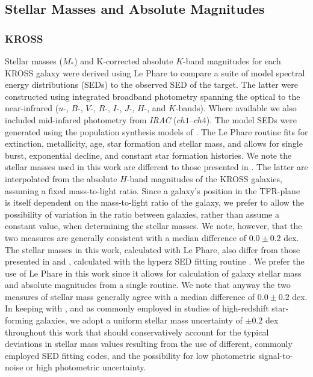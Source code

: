 \documentclass[a4paper,fleqn,usenatbib]{mnras}
\begin{document}
\subsection{Stellar Masses and Absolute Magnitudes}

\subsubsection{KROSS}
\label{subsubsec:KROSSSED}

Stellar masses ($M_{*}$) and K-corrected absolute $K$-band magnitudes for each KROSS galaxy were derived using {\sc Le Phare} \citep{Arnouts:1999,Ilbert:2006} to compare a suite of model spectral energy distributions (SEDs) to the observed SED of the target. The latter were constructed using integrated broadband photometry spanning the optical to the near-infrared ($u$-, $B$-, $V$-, $R$-, $I$-, $J$-, $H$-, and $K$-bands). Where available we also included mid-infared photometry from {\it IRAC} ($ch1$--$ch4$). The model SEDs were generated using the population synthesis models of \citet{Bruzual:2003aa}. The {\sc Le Phare} routine fits for extinction, metallicity, age, star formation and stellar mass, and allows for single burst, exponential decline, and constant star formation histories. We note the stellar masses used in this work are different to those presented in \citet{Harrison:2017}. The latter are interpolated from the absolute $H$-band magnitudes of the KROSS galaxies, assuming a fixed mass-to-light ratio. Since a galaxy's position in the TFR-plane is itself dependent on the mass-to-light ratio of the galaxy, we prefer to allow the possibility of variation in the ratio between galaxies, rather than assume a constant value, when determining the stellar masses. We note, however, that the two measures are generally consistent with a median difference of $0.0 \pm 0.2$ dex. The stellar masses in this work, calculated with {\sc Le Phare}, also differ from those presented in \citet{Stott:2016} and \citet{Tiley:2016}, calculated with the {\sc hyperz} SED fitting routine \citep{Bolzonella:2000}. We prefer the use of {\sc Le Phare} in this work since it allows for calculation of galaxy stellar mass and absolute magnitudes from a single routine. We note that anyway the two measures of stellar mass generally agree with a median difference of $0.0\pm0.2$ dex. In keeping with \citet{Tiley:2016}, and as commonly employed in studies of high-redshift star-forming galaxies, we adopt a uniform stellar mass uncertainty of $\pm 0.2$ dex throughout this work \citep[e.g.][]{Mobasher:2015} that should conservatively account for the typical deviations in stellar mass values resulting from the use of different, commonly employed SED fitting codes, and the possibility for low photometric signal-to-noise or high photometric uncertainty.
\end{document}
